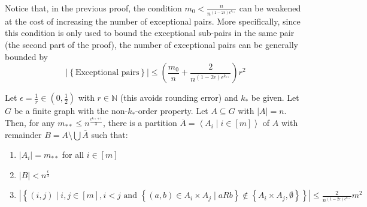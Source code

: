     \remark[Remark 4.15]
        Notice that, in the previous proof, the condition $m_0 < \frac{n}{n^{(1-2\epsilon)\epsilon^{k_{**}}}}$ can be
        weakened at the cost of increasing the number of exceptional pairs.
        More specifically, since this condition is only used to bound the exceptional sub-pairs in the same pair
        (the second part of the proof), the number of exceptional pairs can be generally bounded by
        \[
            |\left\{ \text{Exceptional pairs} \right\}|
                \leq \left( \frac{m_0}{n} + \frac{2}{n^{(1-2\epsilon)\epsilon^{k_{**}}}} \right) r^2
        \]

    \theorem[Theorem 4.16]
        Let $\epsilon = \frac{1}{r} \in \left( 0, \frac{1}{2} \right)$ with $r \in \mathbb{N}$ (this avoids rounding error)
        and $k_*$ be given.
        Let $G$ be a finite graph with the non-$k_*$-order property.
        Let $A \subseteq G$ with $|A| = n$.
        Then, for any $m_{**} \leq n^{\frac{\epsilon^{k_{**}+1}}{3}}$, there is a partition
        $\overline{A} = \left< A_i \mid i \in [m] \right>$ of $A$ with remainder $B = A \setminus \bigcup \overline{A}$
        such that:
        \begin{enumerate}
            \item\label{itm:4.16.1} $|A_i| = m_{**}$ for all $i \in [m]$
            \item\label{itm:4.16.2} $|B| < n^{\frac{\epsilon}{3}}$
            \item\label{itm:4.16.3} $|\left\{ (i,j) \mid i,j \in [m], i < j \text{ and }
                \left\{ (a,b) \in A_i \times A_j \mid a R b \right\} \notin
                \left\{ A_i \times A_j, \emptyset \right\} \right\}|
                \leq \frac{2}{n^{(1-2\epsilon)\epsilon^{k_{**}}}} m^2$
        \end{enumerate}
